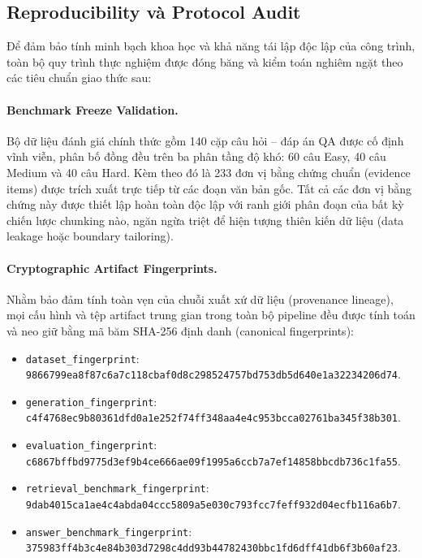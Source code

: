 \subsection{Reproducibility và Protocol Audit}
\label{subsec:reproducibility_audit}

Để đảm bảo tính minh bạch khoa học và khả năng tái lập độc lập của công trình, toàn bộ quy trình thực nghiệm được đóng băng và kiểm toán nghiêm ngặt theo các tiêu chuẩn giao thức sau:

\paragraph{Benchmark Freeze Validation.}
Bộ dữ liệu đánh giá chính thức gồm 140 cặp câu hỏi -- đáp án QA được cố định vĩnh viễn, phân bố đồng đều trên ba phân tầng độ khó: 60 câu Easy, 40 câu Medium và 40 câu Hard. Kèm theo đó là 233 đơn vị bằng chứng chuẩn (evidence items) được trích xuất trực tiếp từ các đoạn văn bản gốc. Tất cả các đơn vị bằng chứng này được thiết lập hoàn toàn độc lập với ranh giới phân đoạn của bất kỳ chiến lược chunking nào, ngăn ngừa triệt để hiện tượng thiên kiến dữ liệu (data leakage hoặc boundary tailoring).

\paragraph{Cryptographic Artifact Fingerprints.}
Nhằm bảo đảm tính toàn vẹn của chuỗi xuất xứ dữ liệu (provenance lineage), mọi cấu hình và tệp artifact trung gian trong toàn bộ pipeline đều được tính toán và neo giữ bằng mã băm SHA-256 định danh (canonical fingerprints):
\begin{itemize}
    \item \texttt{dataset\_fingerprint}: \texttt{9866799ea8f87c6a}\allowbreak\texttt{7c118cbaf0d8c298}\allowbreak\texttt{524757bd753db5d6}\allowbreak\texttt{40e1a32234206d74}.
    \item \texttt{generation\_fingerprint}: \texttt{c4f4768ec9b80361}\allowbreak\texttt{dfd0a1e252f74ff3}\allowbreak\texttt{48aa4e4c953bcca0}\allowbreak\texttt{2761ba345f38b301}.
    \item \texttt{evaluation\_fingerprint}: \texttt{c6867bffbd9775d3}\allowbreak\texttt{ef9b4ce666ae09f1}\allowbreak\texttt{995a6ccb7a7ef148}\allowbreak\texttt{58bbcdb736c1fa55}.
    \item \texttt{retrieval\_benchmark\_fingerprint}: \texttt{9dab4015ca1ae4c4}\allowbreak\texttt{abda04ccc5809a5e}\allowbreak\texttt{030c793fcc7feff9}\allowbreak\texttt{32d04ecfb116a6b7}.
    \item \texttt{answer\_benchmark\_fingerprint}: \texttt{375983ff4b3c4e84}\allowbreak\texttt{b303d7298c4dd93b}\allowbreak\texttt{44782430bbc1fd6d}\allowbreak\texttt{ff41db6f3b60af23}.
\end{itemize}

